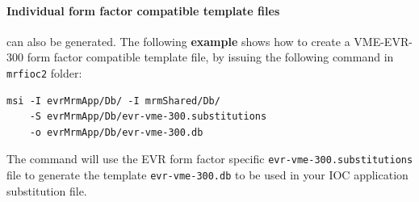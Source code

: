\documentclass[12pt,a4paper]{article}
\begin{document}
\paragraph{Individual form factor compatible template files} can also be generated. The following \textbf{example} shows how to create a VME-EVR-300 form factor compatible template file, by issuing the following command in \newline\texttt{mrfioc2} folder:

\begin{verbatim}
msi -I evrMrmApp/Db/ -I mrmShared/Db/ 
    -S evrMrmApp/Db/evr-vme-300.substitutions 
    -o evrMrmApp/Db/evr-vme-300.db 
\end{verbatim}

The command will use the EVR form factor specific \newline\texttt{evr-vme-300.substitutions}
file to generate the template \newline\texttt{evr-vme-300.db} to be used in your IOC application substitution file.



%
%
%
\end{document}
